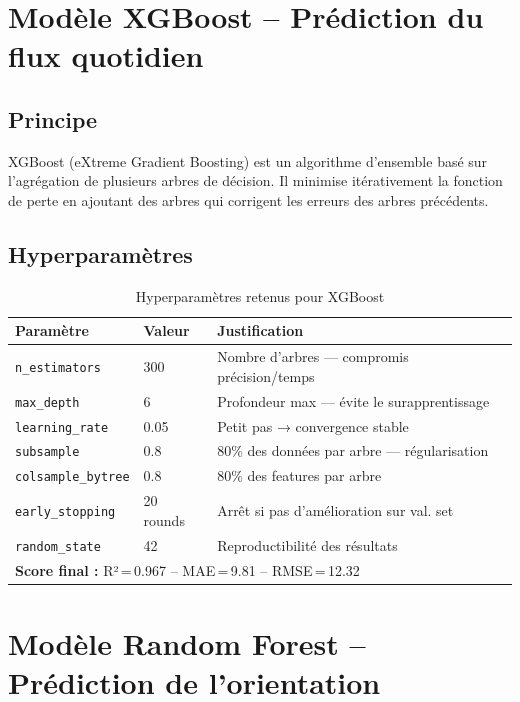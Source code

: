 \documentclass[12pt,a4paper]{report}
\begin{document}
	\section{Modèle XGBoost -- Prédiction du flux quotidien}
	
	\subsection{Principe}
	
	XGBoost (eXtreme Gradient Boosting) est un algorithme d'ensemble basé sur l'agrégation
	de plusieurs arbres de décision. Il minimise itérativement la fonction de perte en ajoutant
	des arbres qui corrigent les erreurs des arbres précédents.
	
	\subsection{Hyperparamètres}
	
	\begin{table}[H]
		\centering
		\caption{Hyperparamètres retenus pour XGBoost}
		\renewcommand{\arraystretch}{1.3}
		\begin{tabular}{lll}
			\toprule
			\textbf{Paramètre} & \textbf{Valeur} & \textbf{Justification} \\
			\midrule
			\texttt{n\_estimators}     & 300        & Nombre d'arbres — compromis précision/temps \\
			\texttt{max\_depth}        & 6          & Profondeur max — évite le surapprentissage \\
			\texttt{learning\_rate}    & 0.05       & Petit pas → convergence stable \\
			\texttt{subsample}         & 0.8        & 80\% des données par arbre — régularisation \\
			\texttt{colsample\_bytree} & 0.8        & 80\% des features par arbre \\
			\texttt{early\_stopping}   & 20 rounds  & Arrêt si pas d'amélioration sur val. set \\
			\texttt{random\_state}     & 42         & Reproductibilité des résultats \\
			\midrule
			\multicolumn{3}{l}{\textbf{Score final :} R²\,=\,0.967 -- MAE\,=\,9.81 -- RMSE\,=\,12.32} \\
			\bottomrule
		\end{tabular}
	\end{table}
	
	\section{Modèle Random Forest -- Prédiction de l'orientation}
	
\end{document}
